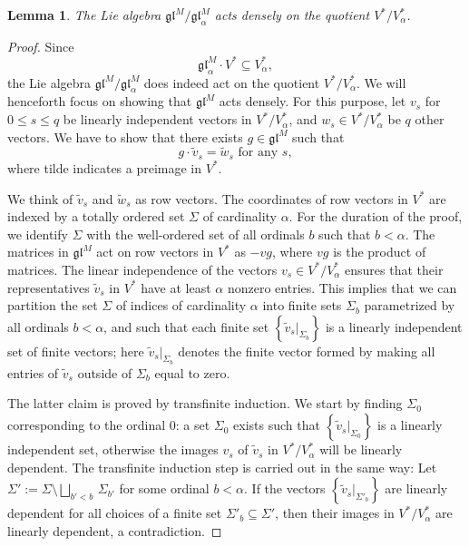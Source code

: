 \documentclass[11pt]{article}
\theoremstyle{plain}
\newtheorem{lemma}{Lemma}[section]
\theoremstyle{nonumberplain}
\theoremstyle{plain}
\theoremstyle{nonumberplain}
\newtheorem{proof}{Proof}
\newcommand\fgl{\mathfrak{gl}}
\begin{document}
\begin{lemma}\label{le.dense}
  The Lie algebra $\fgl^M/\fgl^M_\alpha$ acts densely on the quotient $V^*/V^*_\alpha$.  
\end{lemma}
\begin{proof}
Since
\begin{equation*}
  \fgl^M_\alpha\cdot V^*\subseteq V^*_\alpha,
\end{equation*}
the Lie algebra ${\fgl^M/\fgl_\alpha^M}$ does indeed act on the
quotient $V^*/V^*_\alpha$. We will henceforth focus on showing that $\fgl^M$ acts
densely. For this purpose, let $v_s$ for $0\le s\le q$ be linearly
independent vectors in $V^*/V^*_\alpha$, and $w_s\in V^*/V_\alpha^*$ be $q$ other
vectors. We have to show that there exists $g\in\fgl^M$ such that
\begin{equation}\label{eq:le.dense}
  g\cdot{\tilde{v}_s=\tilde{w}_s}\text{ for any }s{,}
\end{equation}
{where tilde indicates a preimage in $V^*$}. 

We think of $\tilde{v}_s$ and $\tilde{w}_s$ as row vectors.  The
coordinates of row vectors in $V^*$ are indexed by a totally ordered set $\Sigma$ of
cardinality $\alpha$.  For the duration of the proof, we identify $\Sigma$ with the well-ordered set of all
ordinals $b$ such that $b<\alpha$. The matrices in $\fgl^M$
act on row vectors in $V^*$ as $-vg$, where $vg$ is the product of
matrices. The linear independence of the vectors
$v_s\in V^*/V^*_\alpha$ ensures that their representatives
$\tilde{v}_s$ in $V^*$ have {at least} $\alpha$ nonzero entries.  This
implies that we can partition the set $\Sigma$ of indices of
cardinality $\alpha$ into finite sets $\Sigma_b$ parametrized by
all ordinals $b<\alpha$, and such that each finite set
$\left\{\tilde{v}_s|_{\Sigma_b}\right\}$ is a linearly independent
set of finite vectors; here $\tilde{v}_s|_{\Sigma_b}$ denotes the
finite vector formed by making all entries of $\tilde{v}_s$ outside of
$\Sigma_b$ equal to zero.  

The latter claim is proved by transfinite
induction.  We start by finding $\Sigma_0$ corresponding to the
ordinal $0$: a set $\Sigma_0$ exists such that
$\left\{\tilde{v}_s|_{\Sigma_0}\right\}$ is a linearly independent
set, otherwise the images $v_s$ of $\tilde{v}_s$ in $V^*/V_\alpha^*$
will be linearly dependent.  The transfinite induction step is carried
out in the same way: Let
$\Sigma':=\Sigma\setminus\bigsqcup_{b'<b}\,\Sigma_{b'}$
for some ordinal $b<\alpha$.  If the vectors
$\left\{\tilde{v}_s|_{\Sigma'_b}\right\}$ are linearly dependent
for all choices of a finite set $\Sigma'_b\subseteq \Sigma'$, then
their images in $V^*/V_\alpha^*$ are linearly dependent, a
contradiction.


\end{proof}
\end{document}
